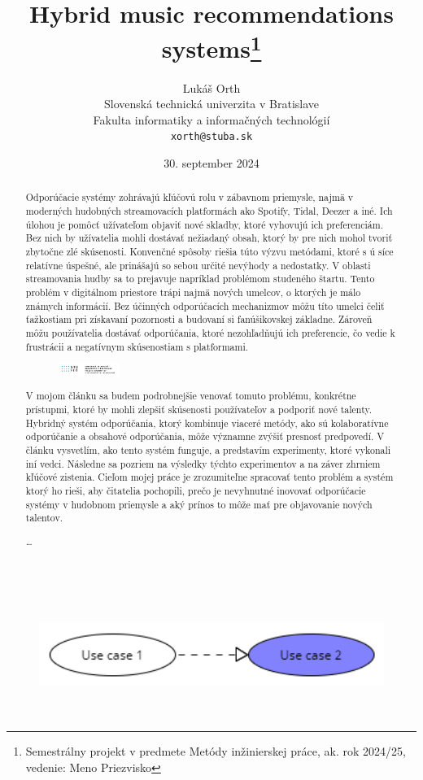 \documentclass[10pt,twocolumn,slovak,a4paper]{coursepaper}
\title{Hybrid music recommendations systems\thanks{Semestrálny projekt v predmete Metódy inžinierskej práce, ak. rok 2024/25, vedenie: Meno Priezvisko}} %
\author{Lukáš Orth\\[2pt]
	{\small Slovenská technická univerzita v Bratislave}\\
	{\small Fakulta informatiky a informačných technológií}\\
	{\small \texttt{xorth@stuba.sk}}
	}
\date{\small 30. september 2024} %
\begin{document}
\maketitle

\begin{abstract}
Odporúčacie systémy zohrávajú kľúčovú rolu v zábavnom priemysle, najmä v moderných hudobných streamovacích platformách ako Spotify, Tidal, Deezer a iné. Ich úlohou je pomôcť užívateľom objaviť nové skladby, ktoré vyhovujú ich preferenciám. Bez nich by užívatelia mohli dostávať nežiadaný obsah, ktorý by pre nich mohol tvoriť zbytočne zlé skúsenosti. Konvenčné spôsoby riešia túto výzvu metódami, ktoré s	ú síce relatívne úspešné, ale prinášajú so sebou určité nevýhody a nedostatky. V oblasti streamovania hudby sa to prejavuje napríklad problémom studeného štartu. Tento problém v digitálnom priestore trápi najmä nových umelcov, o ktorých je málo známych informácií. Bez účinných odporúčacích mechanizmov môžu títo umelci čeliť ťažkostiam pri získavaní pozornosti a budovaní si fanúšikovskej základne. Zároveň môžu používatelia dostávať odporúčania, ktoré nezohľadňujú ich preferencie, čo vedie k frustrácii a negatívnym skúsenostiam s platformami.
\begin{figure}
  \begin{center}
    \includegraphics[width=0.2\textwidth]{STU-FIIT-nfh.png}
  \end{center}
  \caption{}
\end{figure}
V mojom článku sa budem podrobnejšie venovať tomuto problému, konkrétne prístupmi, ktoré by mohli zlepšiť skúsenosti používateľov a podporiť nové talenty. Hybridný systém odporúčania, ktorý kombinuje viaceré metódy, ako sú kolaboratívne odporúčanie a obsahové odporúčania, môže významne zvýšiť presnosť predpovedí. V článku vysvetlím, ako tento systém funguje, a predstavím experimenty, ktoré vykonali iní vedci. Následne sa pozriem na výsledky týchto experimentov a na záver zhrniem kľúčové zistenia. Cieľom mojej práce je zrozumiteľne spracovať tento problém a systém ktorý ho rieši, aby čitatelia pochopili, prečo je nevyhnutné inovovať odporúčacie systémy v hudobnom priemysle a aký prínos to môže mať pre objavovanie nových talentov.


\ldots
\end{abstract}


\begin{figure}[h]
  \includegraphics[width=\textwidth,height=4cm]{diagramtest1.png}
\end{figure}
\end{document}
